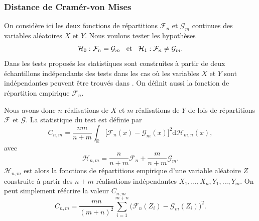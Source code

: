 \documentclass[a4paper,11pt]{article}
\numberwithin{equation}{section}
\begin{document}
\subsubsection{Distance de Cramér-von Mises}
\label{ch:Cv-M distance}
On considère ici les deux fonctions de répartitions $\mathcal{F}_{n}$ et $\mathcal{G}_{m}$ continues des variables aléatoires $X$ et $Y$. Nous voulons tester les hypothèses
\begin{equation*}
	\mathcal{H}_0 : \mathcal{F}_{n} = \mathcal{G}_{m} \hspace{3mm}\textrm{et}\hspace{3mm} \mathcal{H}_1 : \mathcal{F}_{n} \neq \mathcal{G}_{m}.
\end{equation*}
Dans les tests proposés les statistiques sont construites à partir de deux échantillons indépendants des tests dans les cas où les variables $X$ et $Y$ sont indépendantes peuvent être trouvés dans \cite{ethier2011propos}. On définit aussi la fonction de répartition empirique $\mathcal{F}_n$.

Nous avons donc $n$ réalisations de $X$ et $m$ réalisations de $Y$ de lois de répartitions $\mathcal{F}$ et $\mathcal{G}$.
La statistique du test est définie par
\begin{equation}
	C_{n,m}=\frac{nm}{n+m}\int_{\mathbb{R}}\big[ \mathcal{F}_{n}(x)-\mathcal{G}_{m}(x)\big]^{2} \mathrm{d} \mathcal{H}_{m,n}(x),
\end{equation}
avec
\begin{equation}
	\mathcal{H}_{n,m}=\frac{n}{n+m}\mathcal{F}_n+\frac{m}{n+m}\mathcal{G}_m.
\end{equation}
$\mathcal{H}_{n,m}$ est alors la fonctions de répartitions empirique d'une variable aléatoire $Z$ construite à partir des $n+m$ réalisations indépendantes $X_1,...,X_n,Y_1,...,Y_m$. On peut simplement réécrire la valeur $C_{n,m}$
\begin{equation}
	C_{n,m}=\frac{mn}{(m+n)^2}\sum_{i=1}^{m+n}\big(\mathcal{F}_n(Z_i)-\mathcal{G}_{m}(Z_i)\big)^2.
\end{equation}
\end{document}
